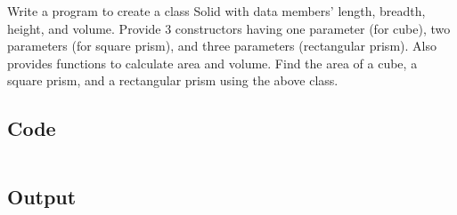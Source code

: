 \documentclass[../main.tex]{subfiles}
\begin{document}
Write a program to create a class Solid with data members’ length, breadth,
height, and volume. Provide 3 constructors having one parameter (for cube), two
parameters (for square prism), and three parameters (rectangular prism). Also
provides functions to calculate area and volume. Find the area of a cube, a
square prism, and a rectangular prism using the above class.

\subsection{Code}
\inputminted[frame=lines, breaklines, breakanywhere, numberblanklines=false]{java}{./programs/prog4/Solid.java}

\subsection{Output}
\end{document}
